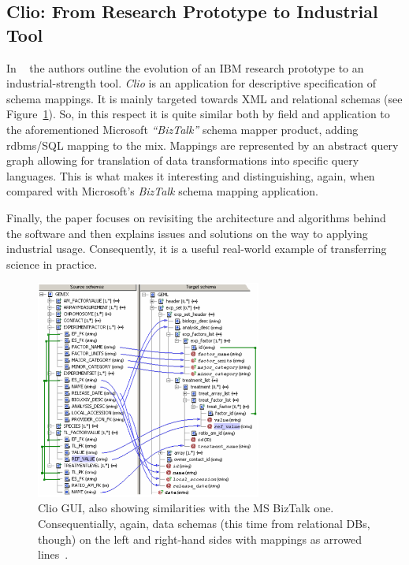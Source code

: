 \subsection{Clio: From Research Prototype to Industrial Tool}

In ~\cite{Haas2005} the authors outline the evolution of an IBM research prototype to an industrial-strength tool.
\emph{Clio} is an application for descriptive specification of schema mappings.
It is mainly targeted towards \textsc{XML} and relational schemas (see Figure~\ref{fig:clio-screenshot}).
So, in this respect it is quite similar both by field and application to the aforementioned Microsoft \emph{``BizTalk''} schema mapper product, adding \gls{rdbms}/\textsc{SQL} mapping to the mix.
Mappings are represented by an abstract query graph allowing for translation of data transformations into specific query languages.
This is what makes it interesting and distinguishing, again, when compared with Microsoft's \emph{BizTalk} schema mapping application.

Finally, the paper focuses on revisiting the architecture and algorithms behind the software and then explains issues and solutions on the way to applying industrial usage.
Consequently, it is a useful real-world example of transferring science in practice.

\begin{figure}[h]
  \centering
  \includegraphics[width=0.66\textwidth]{figures/state-of-the-art/clio-grown-up}
  \caption{Clio GUI, also showing similarities with the MS BizTalk one. Consequentially, again, data schemas (this time from relational DBs, though) on the left and right-hand sides with mappings as arrowed lines~\cite{Haas2005}.}
  \label{fig:clio-screenshot}
\end{figure}


